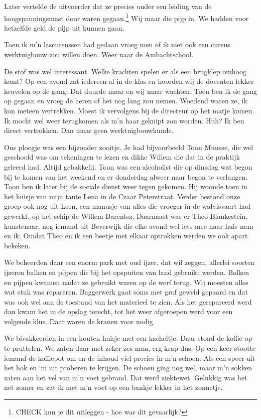 \documentclass[12pt,twoside]{memoir}
\begin{document}
Later vertelde de uitvoerder dat ze precies onder een leiding van de hoogspanningsmast door waren gegaan.\footnote{CHECK kun je dit uitleggen - hoe was dit gevaarlijk?} Wij maar die pijp in. We hadden voor hetzelfde geld de pijp uit kunnen gaan.

Toen ik m’n lascursussen had gedaan vroeg men of ik niet ook een cursus werktuigbouw zou willen doen. Weer naar de Ambachtschool. 

De stof was wel interessant. Welke krachten spelen er als een brugklep omhoog komt? Op een avond zat iedereen al in de klas en hoorden wij de docenten lekker keuvelen op de gang. Dat duurde maar en wij maar wachten. Toen ben ik de gang op gegaan en vroeg de heren of het nog lang zou nemen. Woedend waren ze, ik kon meteen vertrekken. Moest ik vervolgens bij de directeur op het matje komen. Ik mocht wel weer terugkomen als m’n haar geknipt zou worden. Huh? Ik ben direct vertrokken. Dan maar geen werktuigbouwkunde.

Ons ploegje was een bijzonder zooitje. Je had bijvoorbeeld Toon Muusse, die wel geschoold was om tekeningen te lezen en dikke Willem die dat in de praktijk geleerd had. Altijd gebakkelij. Toon was een alcoholist die op dinsdag wat begon bij te komen van het weekend en er donderdag alweer naar begon te verlangen. Toon ben ik later bij de sociale dienst weer tegen gekomen. Hij woonde toen in het huisje van mijn tante Lena in de Czaar Peterstraat. Verder bestond onze groep ook nog uit Leen, een manusje van alles die vroeger in de walvisvaart had gewerkt, op het schip de Willem Barentsz. Daarnaast was er Theo Blankestein, kunstenaar, nog iemand uit Beverwijk die elke avond wel iets mee naar huis nam en ik. Omdat Theo en ik een beetje met elkaar optrokken werden we ook apart bekeken. 

We beheerden daar een enorm park met oud ijzer, dat wil zeggen, allerlei soorten ijzeren balken en pijpen die bij het opspuiten van land gebruikt werden. Balken en pijpen kwamen nadat ze gebruikt waren op de werf terug. Wij moesten alles wat stuk was repareren. Baggerwerk gaat soms met grof geweld gepaard en dat was ook wel aan de toestand van het materieel te zien. Als het gerepareerd werd dan kwam het in de opslag terecht, tot het weer afgeroepen werd voor een volgende klus. Daar waren de kranen voor nodig. 

We bivakkeerden in een houten huisje met een kacheltje. Daar stond de koffie op te pruttelen. We zaten daar met zeker zes man, erg krap dus. Op een keer stootte iemand de koffiepot om en de inhoud viel precies in m'n schoen. Als een speer uit het hok en `m uit proberen te krijgen. De schoen ging nog wel, maar m'n sokken zaten aan het vel van m'n voet gebrand. Dat werd ziektewet. Gelukkig was het net zomer en zat ik met m'n voet op een bankje lekker in het zonnetje.
\end{document}
